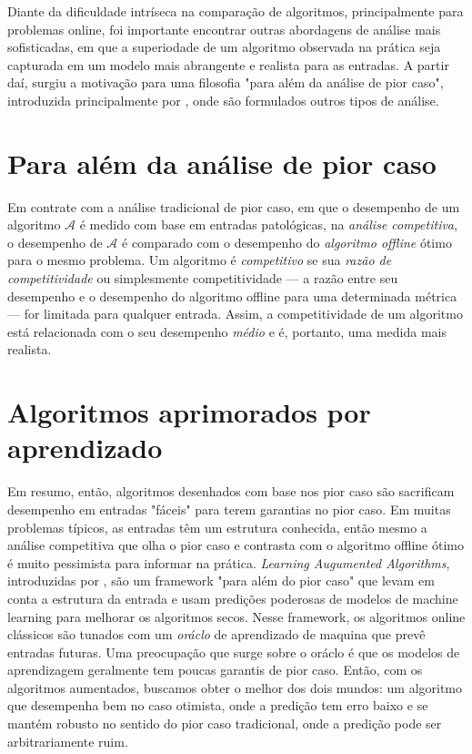 Diante da dificuldade intríseca na comparação de algoritmos, principalmente para problemas online, foi importante encontrar outras abordagens de análise mais sofisticadas, em que a superiodade de um algoritmo observada na prática seja capturada em um modelo mais abrangente e realista para as entradas. A partir daí, surgiu a motivação para uma filosofia "para além da análise de pior caso", introduzida principalmente por \textcite{Roughgarden19}, onde são formulados outros tipos de análise. 


\section{Para além da análise de pior caso}

Em contrate com a análise tradicional de pior caso, em que o desempenho de um algoritmo \(\mathcal{A}\) é medido com base em entradas patológicas, na \emph{análise competitiva}, o desempenho de \(\mathcal{A}\) é comparado com o desempenho do \emph{algoritmo offline} ótimo para o mesmo problema. Um algoritmo é \emph{competitivo} se sua \emph{razão de competitividade} ou simplesmente competitividade — a razão entre seu desempenho e o desempenho do algoritmo offline para uma determinada métrica — for limitada para qualquer entrada. Assim, a competitividade de um algoritmo está relacionada com o seu desempenho \emph{médio} e é, portanto, uma medida mais realista. 


\section{Algoritmos aprimorados por aprendizado}

Em resumo, então, algoritmos desenhados com base nos pior caso são sacrificam desempenho em entradas "fáceis" para terem garantias no pior caso. Em muitas problemas típicos, as entradas têm um estrutura conhecida, então mesmo a análise competitiva que olha o pior caso e contrasta com o algoritmo offline ótimo é muito pessimista para informar na prática. \emph{Learning Augumented Algorithms}, introduzidas por \textcite{Lykouris18}, são um framework "para além do pior caso" que levam em conta a estrutura da entrada e usam predições poderosas de modelos de machine learning para melhorar os algoritmos secos. Nesse framework, os algoritmos online clássicos são tunados com um \emph{oráclo} de aprendizado de maquina que prevê entradas futuras. Uma preocupação que surge sobre o oráclo é que os modelos de aprendizagem geralmente tem poucas garantis de pior caso. Então, com os algoritmos aumentados, buscamos obter o melhor dos dois mundos: um algoritmo que desempenha bem no caso otimista, onde a predição tem erro baixo e se mantém robusto no sentido do pior caso tradicional, onde a predição pode ser arbitrariamente ruim. 

